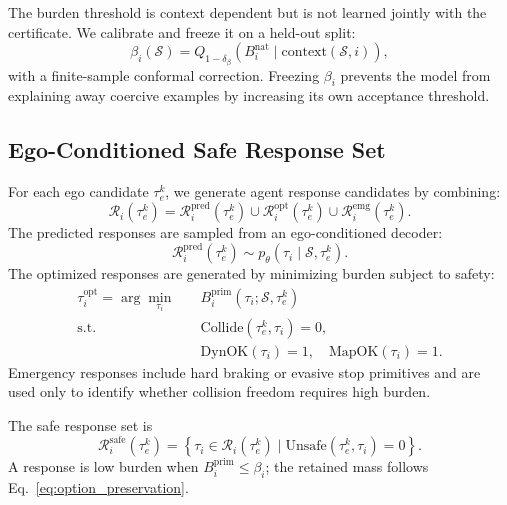\documentclass[10pt]{article}
\begin{document}
The burden threshold is context dependent but is not learned jointly with the certificate. We calibrate and freeze it on a held-out split:
\begin{equation}
    \beta_i(\mathcal{S})
    =Q_{1-\delta_\beta}
    \left(B_i^{\mathrm{nat}}\mid \mathrm{context}(\mathcal{S},i)\right),
\end{equation}
with a finite-sample conformal correction. Freezing $\beta_i$ prevents the model from explaining away coercive examples by increasing its own acceptance threshold.

\subsection{Ego-Conditioned Safe Response Set}
\label{app:safe_response}

For each ego candidate $\tau^k_e$, we generate agent response candidates by combining:
\begin{equation}
    \mathcal{R}_i(\tau^k_e)
    =
    \mathcal{R}^{\mathrm{pred}}_i(\tau^k_e)
    \cup
    \mathcal{R}^{\mathrm{opt}}_i(\tau^k_e)
    \cup
    \mathcal{R}^{\mathrm{emg}}_i(\tau^k_e).
\end{equation}
The predicted responses are sampled from an ego-conditioned decoder:
\begin{equation}
    \mathcal{R}^{\mathrm{pred}}_i(\tau^k_e)
    \sim
    p_\theta(\tau_i \mid \mathcal{S},\tau^k_e).
\end{equation}
The optimized responses are generated by minimizing burden subject to safety:
\begin{equation}
\begin{aligned}
    \tau_i^{\mathrm{opt}}
    =
    \arg\min_{\tau_i}\quad
    &
    B_i^{\mathrm{prim}}(\tau_i;\mathcal{S},\tau^k_e) \\
    \mathrm{s.t.}\quad
    &
    \mathrm{Collide}(\tau^k_e,\tau_i)=0,\\
    &
    \mathrm{DynOK}(\tau_i)=1,\quad
    \mathrm{MapOK}(\tau_i)=1 .
\end{aligned}
\end{equation}
Emergency responses include hard braking or evasive stop primitives and are used only to identify whether collision freedom requires high burden.

The safe response set is
\begin{equation}
    \mathcal{R}^{\mathrm{safe}}_i(\tau^k_e)
    =
    \left\{
    \tau_i\in\mathcal{R}_i(\tau^k_e)
    \mid
    \mathrm{Unsafe}(\tau^k_e,\tau_i)=0
    \right\}.
\end{equation}
A response is low burden when $B_i^{\mathrm{prim}}\le\beta_i$; the retained mass follows Eq.~\eqref{eq:option_preservation}.
\end{document}
